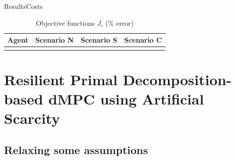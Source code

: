\documentclass[aspectratio=169]{beamer}
\begin{document}
\begin{frame}{Results}{Costs}
  \begin{table}[h]
    \centering
    \caption*{Objective functions $J_{i}$ (\% error)}\label{tab:eq_costsGlobalLocal}
    \begin{tabular}[t]{cccc}
      \toprule
      Agent  & Scenario N& Scenario S & Scenario C\\
      \midrule
      \\
      \bottomrule
    \end{tabular}
  \end{table}
  \pause
\end{frame}

\section{Resilient Primal Decomposition-based dMPC using Artificial Scarcity}
\subsection{Relaxing some assumptions}
\end{document}
